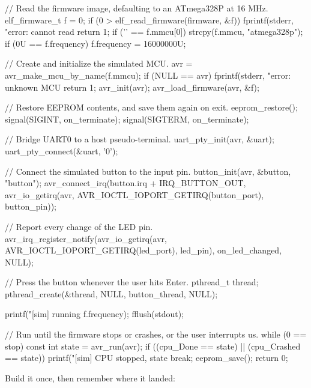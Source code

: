 \begin{ccode}
{    // Read the firmware image, defaulting to an ATmega328P at 16 MHz.
    elf_firmware_t f = {{0}};
    if (0 > elf_read_firmware(firmware, &f))
    {
        fprintf(stderr, "error: cannot read %
        return 1;
    }
    if ('\0' == f.mmcu[0]) { strcpy(f.mmcu, "atmega328p"); }
    if (0U == f.frequency) { f.frequency = 16000000U; }

    // Create and initialize the simulated MCU.
    avr = avr_make_mcu_by_name(f.mmcu);
    if (NULL == avr)
    {
        fprintf(stderr, "error: unknown MCU %
        return 1;
    }
    avr_init(avr);
    avr_load_firmware(avr, &f);

    // Restore EEPROM contents, and save them again on exit.
    eeprom_restore();
    signal(SIGINT, on_terminate);
    signal(SIGTERM, on_terminate);

    // Bridge UART0 to a host pseudo-terminal.
    uart_pty_init(avr, &uart);
    uart_pty_connect(&uart, '0');

    // Connect the simulated button to the input pin.
    button_init(avr, &button, "button");
    avr_connect_irq(button.irq + IRQ_BUTTON_OUT,
                    avr_io_getirq(avr, AVR_IOCTL_IOPORT_GETIRQ(button_port), button_pin));

    // Report every change of the LED pin.
    avr_irq_register_notify(avr_io_getirq(avr, AVR_IOCTL_IOPORT_GETIRQ(led_port), led_pin),
                            on_led_changed, NULL);

    // Press the button whenever the user hits Enter.
    pthread_t thread;
    pthread_create(&thread, NULL, button_thread, NULL);

    printf("[sim] running %
           f.frequency);
    fflush(stdout);

    // Run until the firmware stops or crashes, or the user interrupts us.
    while (0 == stop)
    {
        const int state = avr_run(avr);
        if ((cpu_Done == state) || (cpu_Crashed == state))
        {
            printf("[sim] CPU stopped, state %
            break;
        }
    }
    eeprom_save();
    return 0;
}
\end{ccode}

\noindent Build it once, then remember where it landed:


